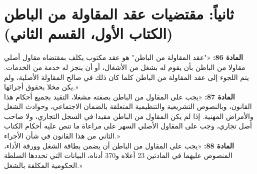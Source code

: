 \section*{ثانياً: مقتضيات عقد المقاولة من الباطن (الكتاب الأول، القسم الثاني)}

\begin{tcolorbox}[colback=lightgray, colframe=maincolor, arc=3pt, title={\textbf{المواد 86 و87 و88}}]
\textbf{المادة \textenglish{86}:} «"عقد المقاولة من الباطن" هو عقد مكتوب يكلف بمقتضاه مقاول أصلي مقاولا من الباطن بأن يقوم له بشغل من الأشغال، أو أن ينجز له خدمة من الخدمات. يتم اللجوء إلى عقد المقاولة من الباطن كلما كان ذلك في صالح المقاولة الأصلية، ولم يكن مخلا بحقوق أجرائها.»
\vspace{0.2cm}\\
\textbf{المادة \textenglish{87}:} «يجب على المقاول من الباطن بصفته مشغلا، التقيد بجميع أحكام هذا القانون، وبالنصوص التشريعية والتنظيمية المتعلقة بالضمان الاجتماعي، وحوادث الشغل والأمراض المهنية. إذا لم يكن المقاول من الباطن مقيدا في السجل التجاري، ولا صاحب أصل تجاري، وجب على المقاول الأصلي السهر على مراعاة ما تنص عليه أحكام الكتاب الثاني من هذا القانون في شأن الأجراء.»
\vspace{0.2cm}\\
\textbf{المادة \textenglish{88}:} «يجب على المقاول من الباطن أن يضمن بطاقة الشغل وورقة الأداء، المنصوص عليهما في المادتين \textenglish{23} أعلاه و\textenglish{370} أدناه، البيانات التي تحددها السلطة الحكومية المكلفة بالشغل.»
\end{tcolorbox}

